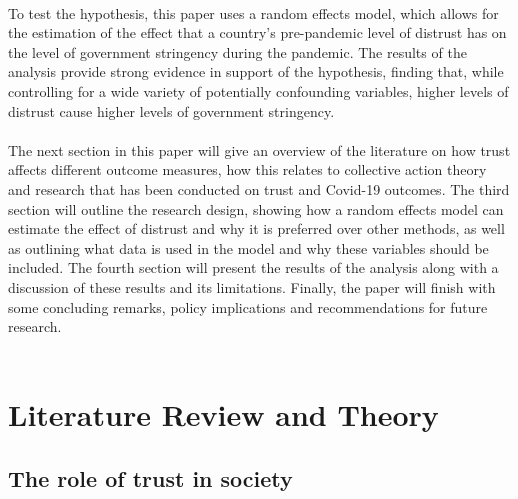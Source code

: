 \documentclass[
  11pt,
]{article}
\begin{document}
~\\
To test the hypothesis, this paper uses a random effects model, which allows for the estimation of the effect that a country's pre-pandemic level of distrust has on the level of government stringency during the pandemic. The results of the analysis provide strong evidence in support of the hypothesis, finding that, while controlling for a wide variety of potentially confounding variables, higher levels of distrust cause higher levels of government stringency.\\
~\\
The next section in this paper will give an overview of the literature on how trust affects different outcome measures, how this relates to collective action theory and research that has been conducted on trust and Covid-19 outcomes. The third section will outline the research design, showing how a random effects model can estimate the effect of distrust and why it is preferred over other methods, as well as outlining what data is used in the model and why these variables should be included. The fourth section will present the results of the analysis along with a discussion of these results and its limitations. Finally, the paper will finish with some concluding remarks, policy implications and recommendations for future research.\\
~\\

\hypertarget{literature-review-and-theory}{%
\section{Literature Review and Theory}\label{literature-review-and-theory}}

\hypertarget{the-role-of-trust-in-society}{%
\subsection{The role of trust in society}\label{the-role-of-trust-in-society}}
\end{document}

